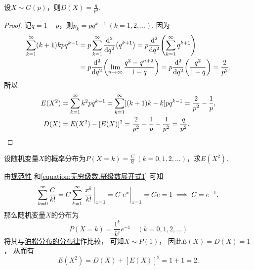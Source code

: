 \begin{theorem}\label{theorem:随机变量的数字特征.几何分布的方差}
设\(X \sim G(p)\)，则\(D(X) = \frac{q}{p^2}\).
\begin{proof}
记\(q = 1-p\)，则\(p_k = pq^{k-1}\ (k=1,2,\dotsc)\).
因为\begin{align*}
	\sum_{k=1}^\infty (k+1)kpq^{k-1}
	&= p \sum_{k=1}^\infty \dv[2]{q}(q^{k+1})
	= p \dv[2]{q}(\sum_{k=1}^\infty q^{k+1}) \\
	&= p \dv[2]{q}(\lim_{n\to\infty} \frac{q^2-q^{n+2}}{1-q})
	= p \dv[2]{q}(\frac{q^2}{1-q})
	= \frac{2}{p^2}, \\
\end{align*}
所以\begin{align*}
	E(X^2) &= \sum_{k=1}^\infty k^2 pq^{k-1}
	= \sum_{k=1}^\infty [(k+1)k-k] pq^{k-1}
	= \frac{2}{p^2} - \frac{1}{p}, \\
	D(X) &= E(X^2) - [E(X)]^2
	= \frac{2}{p^2} - \frac{1}{p} - \frac{1}{p^2}
	= \frac{q}{p^2}.
	\qedhere
\end{align*}
\end{proof}
\end{theorem}

\begin{example}
设随机变量\(X\)的概率分布为\(P(X=k) = \frac{C}{k!}\ (k=0,1,2,\dotsc)\)，求\(E(X^2)\).
\begin{solution}
由\hyperref[theorem:随机变量及其分布.离散型随机变量的密度函数的性质]{规范性}%
和\cref{equation:无穷级数.幂级数展开式1} 可知\[
	\sum_{k=0}^\infty \frac{C}{k!}
	= C \sum_{k=1}^\infty \eval{\frac{x^k}{k!}}_{x=1}
	= C \eval{e^x}_{x=1}
	= C e = 1
	\implies
	C = e^{-1}.
\]
那么随机变量\(X\)的分布为\[
	P(X=k) = \frac{1^k}{k!} e^{-1} \quad(k=0,1,2,\dotsc)
\]
将其与\hyperref[equation:随机变量及其分布.泊松分布的分布律]{泊松分布的分布律}作比较，
可知\(X \sim P(1)\)，
因此\(E(X) = D(X) = 1\)，
从而有\[
	E(X^2) = D(X) + [E(X)]^2 = 1 + 1 = 2.
\]
\end{solution}
\end{example}

